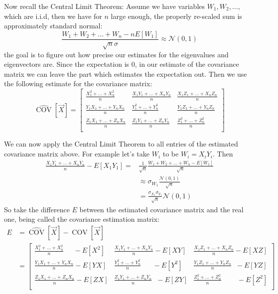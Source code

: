 \documentclass[12pt]{amsart}
\theoremstyle{definition}
\DeclareMathOperator{\Cov}{COV}
\numberwithin{equation}{section}
\numberwithin{equation}{section}
\theoremstyle{remark}
\numberwithin{equation}{section}
\begin{document}
Now recall the Central Limit Theorem: Assume we have variables $W_1,W_2,\ldots$, which are i.i.d, then we have for $n$ large enough, the properly re-scaled sum is approximately standard normal:
$$\frac{W_1+W_2+\ldots+W_n-nE[W_1]}{\sqrt{n}\sigma}\approx \mathcal{N}(0,1)$$
the goal is to figure out how precise our estimates for the eigenvalues and eigenvectors are. Since the expectation is $0$, in our estimate of the covariance matrix we can leave the part which estimates the expectation out. Then we use the following estimate for the covariance matrix:
$$\hat{\Cov}[\vec{X}]=
\left[
\begin{array}{ccccccccc}
\frac{X_1^2+\ldots+X_n^2}{n}&\frac{X_1Y_1+\ldots+X_nY_n}{n}&
\frac{X_1Z_1+\ldots+X_nZ_n}{n}\\
\frac{Y_1X_1+\ldots+Y_nX_n}{n}&\frac{Y_1^2+\ldots+Y_n^2}{n}&
\frac{Y_1Z_1+\ldots+Y_nZ_n}{n}\\
\frac{Z_1X_1+\ldots+Z_nX_n}{n}&\frac{Z_1Y_1+\ldots+Z_nY_n}{n}&
\frac{Z_1^2+\ldots+Z_n^2}{n}\\
\end{array}
\right]$$

We can now apply the Central Limit Theorem to all entries
of the estimated covariance matrix above. For example let's take $W_i$ to be $W_i=X_i Y_i$. Then
\begin{align}\label{lalube}
\frac{X_1Y_1+\ldots+X_nY_n}{n}-E[X_1Y_1]
=& \frac{1}{\sqrt{n}}\frac{W_1+W_2+\ldots+W_n-E[W_1]}{\sqrt{n}}\nonumber\\
&\approx \sigma_{W_1}\frac{\mathcal{N}(0,1)}{\sqrt{n}}\nonumber \\
&=\frac{\sigma_{X_1}\sigma_{Y_1}}{\sqrt{n}}\mathcal{N}(0,1)
\end{align}
So take the difference $E$ between the estimated covariance matrix
and the real one, being called the covariance estimation matrix:
\begin{align*}
E&=\hat{\Cov}[\vec{X}]-\Cov[\vec{X}]\\
&=\left[
\begin{array}{ccccccccc}
\frac{X_1^2+\ldots+X_n^2}{n}\;\;\;\;\;-E[X^2]&\frac{X_1Y_1+\ldots+X_nY_n}{n}-E[XY]&
\frac{X_1Z_1+\ldots+X_nZ_n}{n}-E[XZ]\\
\frac{Y_1X_1+\ldots+Y_nX_n}{n}-E[YX]&\frac{Y_1^2+\ldots+Y_n^2}{n}\;\;\;\;\;\;-E[Y^2]&
\frac{Y_1Z_1+\ldots+Y_nZ_n}{n}\;\;-E[YZ]\\
\frac{Z_1X_1+\ldots+Z_nX_n}{n}-E[ZX]&\frac{Z_1Y_1+\ldots+Z_nY_n}{n}\;\;-
E[ZY]
&
\frac{Z_1^2+\ldots+Z_n^2}{n}\;\;\;\;\;\;\;\;-E[Z^2]\\
\end{array}
\right]
\end{align*}
\end{document}
